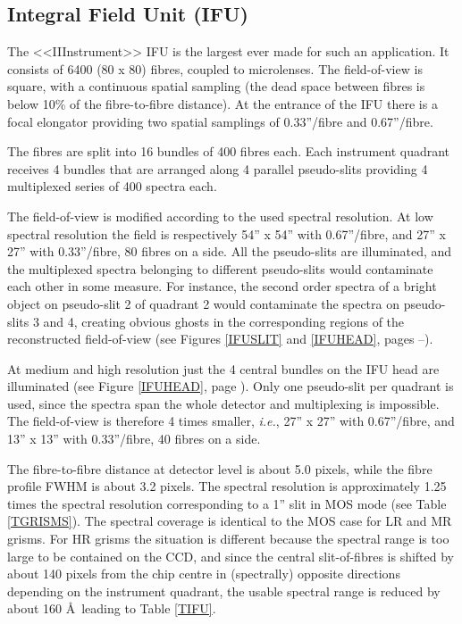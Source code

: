 \newpage

\subsection{Integral Field Unit (IFU)}
\label{INSTR:IFU}

The <<IIInstrument>> IFU is the largest ever made for such an application. 
It consists of 6400 (80 x 80) fibres, coupled to microlenses. 
The field-of-view is square, with a continuous spatial sampling 
(the dead space between fibres is below 10\% 
of the fibre-to-fibre distance). 
At the entrance of the IFU there is a focal elongator providing 
two spatial samplings of 0.33''/fibre and 0.67''/fibre. 

The fibres are
split into 16 bundles of 400 fibres each. Each instrument 
quadrant receives 4 bundles that are arranged along
4 parallel pseudo-slits providing 4 multiplexed series of 400
spectra each.

The field-of-view is modified according to the used
spectral resolution. At low spectral resolution 
the field is respectively 54'' x 54'' with 
0.67''/fibre, and 27'' x 27'' with 0.33''/fibre, 
80 fibres on a side. All the pseudo-slits are illuminated,
and the multiplexed spectra belonging to different pseudo-slits
would contaminate each other in some measure. For instance,
the second order spectra of a bright object on pseudo-slit 2 
of quadrant 2 would contaminate the spectra on pseudo-slits
3 and 4, creating obvious ghosts in the corresponding regions
of the reconstructed field-of-view (see Figures \ref{IFUSLIT} 
and \ref{IFUHEAD}, pages \pageref{IFUSLIT}--\pageref{IFUHEAD}).

At medium and high resolution just the 4 central bundles on the 
IFU head are illuminated (see Figure \ref{IFUHEAD}, page \pageref{IFUHEAD}). 
Only one pseudo-slit per quadrant is used, since the spectra span 
the whole detector and multiplexing is impossible. 
The field-of-view is therefore 4 times smaller, {\it i.e.}, 27'' x 27'' 
with 0.67''/fibre, and 13'' x 13'' with 0.33''/fibre, 40 fibres on a side. 

The fibre-to-fibre distance at detector level is about 5.0 pixels, 
while the fibre profile FWHM is about 3.2 pixels. 
The spectral resolution is approximately 1.25 times the spectral resolution 
corresponding to a 1'' slit in MOS mode (see Table \ref{TGRISMS}).
The spectral coverage is identical to the MOS case for
LR and MR grisms. For HR grisms the situation is different because
the spectral range is too large to be contained on the CCD,
and since the central slit-of-fibres is shifted by about 140 pixels 
from the chip centre in (spectrally) opposite directions
depending on the instrument quadrant, the usable spectral range
is reduced by about 160 \AA\, leading to Table \ref{TIFU}.

